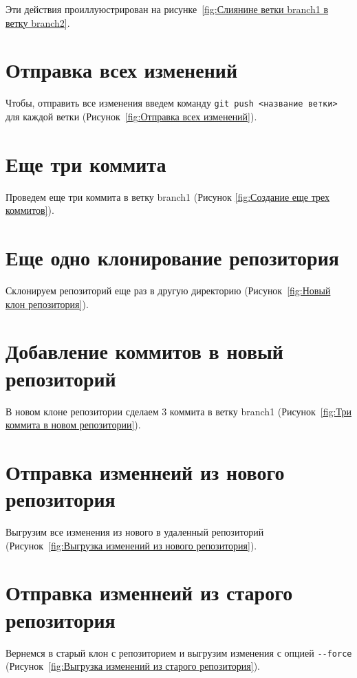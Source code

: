 Эти действия проиллуюстрирован на рисунке~\ref{fig:Слиянине ветки branch1 в ветку branch2}.

\section{Отправка всех изменений}
Чтобы, отправить все изменения введем команду
\texttt{git~push~<название~ветки>} для каждой ветки
(Рисунок~\ref{fig:Отправка всех изменений}).

\section{Еще три коммита}
Проведем еще три коммита в ветку branch1 (Рисунок \ref{fig:Создание еще трех коммитов}).


\section{Еще одно клонирование репозитория}
Склонируем репозиторий еще раз в другую директорию
(Рисунок~\ref{fig:Новый клон репозитория}).


\section{Добавление коммитов в новый репозиторий}
В новом клоне репозитории сделаем 3 коммита в ветку branch1
(Рисунок~\ref{fig:Три коммита в новом репозитории}).

\section{Отправка изменнеий из нового репозитория}
Выгрузим все изменения из нового в удаленный репозиторий
(Рисунок~\ref{fig:Выгрузка изменений из нового репозитория}).


\section{Отправка изменнеий из старого репозитория}
Вернемся в старый клон с репозиторием и выгрузим изменения
с опцией \verb|--force| (Рисунок~\ref{fig:Выгрузка изменений из старого репозитория}).

